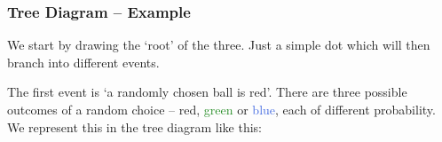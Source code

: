 \documentclass[aspectratio=169,11pt,usenames,dvipsnames]{beamer}
\newcommand{\clr}{\textcolor{BrickRed}}
\newcommand{\clb}{\textcolor{RoyalBlue}}
\newcommand{\clg}{\textcolor{ForestGreen}}
\begin{document}
\begin{frame}
 \frametitle{Tree Diagram -- Example}
 We start by drawing the `root' of the three. Just a simple dot which will then
 branch into different events.
 \vspace*{-2em}
 \begin{center}
 \end{center}
 \pause
 The first event is `a randomly chosen ball is \clr{red}'. There are three
 possible outcomes of a random choice -- \clr{red}, \clg{green} or \clb{blue},
 each of different probability.\\
 \pause
 We represent this in the tree diagram like this:
 \vspace*{-1em}
 \begin{center}
 \end{center}
\end{frame}
\end{document}
